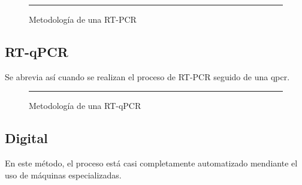 
\begin{figure}[H]\centering
    \resizebox{\linewidth}{!}{}
    \rule{\linewidth}{0.5pt}
    \caption{Metodología de una RT-PCR}
    \label{fig:ciclo_de_rt_pcr}
\end{figure}



\subsection{RT-qPCR}

Se abrevia así cuando se realizan el proceso de RT-PCR seguido de una \acrshort{qpcr}.

\begin{figure}[H]\centering
    \resizebox{\linewidth}{!}{}
    \rule{\linewidth}{0.5pt}
    \caption{Metodología de una RT-qPCR}
    \label{fig:ciclo_de_rt_qpcr}
\end{figure}

\subsection{Digital}

En este método, el proceso está casi completamente automatizado mendiante el uso de máquinas especializadas.